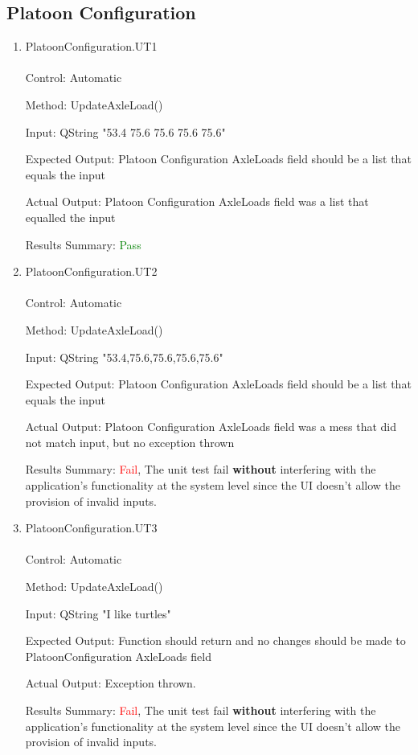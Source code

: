 \documentclass[12pt, titlepage]{article}
\begin{document}
\subsection{Platoon Configuration}
\begin{enumerate}
\item{PlatoonConfiguration.UT1}\\\\
  Control: Automatic

  Method: UpdateAxleLoad()

  Input: QString "53.4 75.6 75.6 75.6 75.6"

  Expected Output: Platoon Configuration AxleLoads field should be a list that equals the input

  Actual Output: Platoon Configuration AxleLoads field was a list that equalled the input

  Results Summary: \textcolor{green} {Pass}
\item{PlatoonConfiguration.UT2}\\\\
  Control: Automatic

  Method: UpdateAxleLoad()

  Input: QString "53.4,75.6,75.6,75.6,75.6"

  Expected Output: Platoon Configuration AxleLoads field should be a list that equals the input

  Actual Output: Platoon Configuration AxleLoads field was a mess that did not match input, but no exception thrown

  Results Summary: \textcolor{red} {Fail}, The unit test fail
\textbf{without} interfering with the application’s functionality at the system level
since the UI doesn’t allow the provision of invalid inputs.

\item{PlatoonConfiguration.UT3}\\\\
  Control: Automatic

  Method: UpdateAxleLoad()

  Input: QString "I like turtles"

  Expected Output: Function should return and no changes should be made to PlatoonConfiguration AxleLoads field

  Actual Output: Exception thrown.

  Results Summary: \textcolor{red} {Fail}, The unit test fail
\textbf{without} interfering with the application’s functionality at the system level
since the UI doesn’t allow the provision of invalid inputs.


\end{enumerate}
\end{document}

